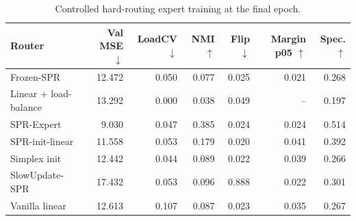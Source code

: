 \begin{table}[t]
\centering
\caption{Controlled hard-routing expert training at the final epoch.}
\label{tab:e5_training_dynamics}
\begin{tabular}{lrrrrrr}
\toprule
Router & Val MSE $\downarrow$ & LoadCV $\downarrow$ & NMI $\uparrow$ & Flip $\downarrow$ & Margin p05 $\uparrow$ & Spec. $\uparrow$ \\
\midrule
Frozen-SPR & 12.472 & 0.050 & 0.077 & 0.025 & 0.021 & 0.268 \\
Linear + load-balance & 13.292 & 0.000 & 0.038 & 0.049 & -- & 0.197 \\
SPR-Expert & 9.030 & 0.047 & 0.385 & 0.024 & 0.024 & 0.514 \\
SPR-init-linear & 11.558 & 0.053 & 0.179 & 0.020 & 0.041 & 0.392 \\
Simplex init & 12.442 & 0.044 & 0.089 & 0.022 & 0.039 & 0.266 \\
SlowUpdate-SPR & 17.432 & 0.053 & 0.096 & 0.888 & 0.022 & 0.301 \\
Vanilla linear & 12.613 & 0.107 & 0.087 & 0.023 & 0.035 & 0.267 \\
\bottomrule
\end{tabular}
\end{table}
